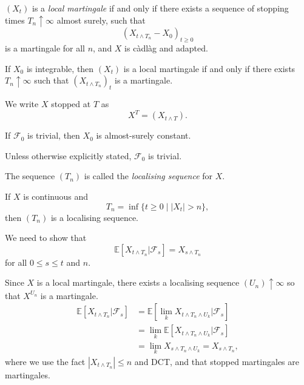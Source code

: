 \documentclass[12pt]{article}
\begin{document}
\begin{definition}
	$(X_t)$ is a \emph{local martingale} if and only if there exists a sequence of stopping times $T_n \uparrow \infty$ almost surely, such that
	\[
		(X_{t \wedge T_n} - X_0)_{t \geq 0}
	\]
	is a martingale for all $n$, and $X$ is c\`adl\`ag and adapted.
\end{definition}

\begin{remark}
	If $X_0$ is integrable, then $(X_t)$ is a local martingale if and only if there exists $T_n \uparrow \infty$ such that $(X_{t \wedge T_n})_t$ is a martingale.

	We write $X$ stopped at $T$ as
	\[
	X^T = (X_{t \wedge T}).
	\]
\end{remark}

\begin{remark}
	If $\mathcal{F}_0$ is trivial, then $X_0$ is almost-surely constant.
\end{remark}

Unless otherwise explicitly stated, $\mathcal{F}_0$ is trivial.

The sequence $(T_n)$ is called the \emph{localising sequence} for $X$.

\begin{proposition}
	If $X$ is continuous and
	\[
		T_n = \inf\{t \geq 0 \mid |X_t| > n\},
	\]
	then $(T_n)$ is a localising sequence.
\end{proposition}

\begin{proofbox}
	We need to show that
	\[
	\mathbb{E}[X_{t \wedge T_n} | \mathcal{F}_s] = X_{s \wedge T_n}
	\]
	for all $0 \leq s \leq t$ and $n$.

	Since $X$ is a local martingale, there exists a localising sequence $(U_n) \uparrow \infty$ so that $X^{U_n}$ is a martingale.
	\begin{align*}
		\mathbb{E}[X_{t \wedge T_n} | \mathcal{F}_s] &= \mathbb{E}[\lim_k X_{t \wedge T_n \wedge U_k} | \mathcal{F}_s] \\
							     &= \lim_{k} \mathbb{E}[X_{t \wedge T_n \wedge U_k} | \mathcal{F}_s] \\
							     &= \lim_{k} X_{s \wedge T_n \wedge U_k} = X_{s \wedge T_n},
	\end{align*}
	where we use the fact $|X_{t \wedge T_n}| \leq n$ and DCT, and that stopped martingales are martingales.
\end{proofbox}
\end{document}
